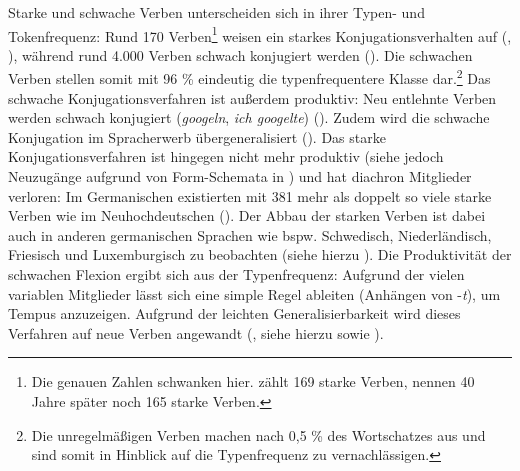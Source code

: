 Starke und schwache Verben unterscheiden sich in ihrer Typen- und Token\-frequenz: Rund 170 Verben\footnote{Die genauen Zahlen schwanken hier. \textcite[258]{Augst.1975} zählt 169 starke Verben, \textcite[310]{Dammel.2014} nennen  40 Jahre später noch 165 starke Verben.} weisen ein starkes Konjugationsverhalten auf (\cite[258]{Augst.1975}, \cite[310]{Dammel.2014}), während rund 4.000 Verben schwach konjugiert werden (\cite[195]{Nubling.1998}). Die schwachen Verben stellen somit mit 96 \% eindeutig die typenfrequentere Klasse dar.\footnote{Die unregelmäßigen Verben machen nach \textcite[258]{Augst.1975} 0,5 \% des Wortschatzes aus und sind somit in Hinblick auf die Typenfrequenz zu vernachlässigen.} Das schwache Konjugationsverfahren ist  außerdem produktiv: Neu entlehnte Verben werden schwach konjugiert (\textit{googeln}, \textit{ich googelte}) (\cite[195]{Nubling.1998}). Zudem wird die schwache Konjugation im Spracherwerb übergeneralisiert (\cite[219--220]{Rumelhart.1986}). Das starke Konjugationsverfahren ist hingegen nicht mehr produktiv (siehe jedoch Neuzugänge aufgrund von Form-Schemata in ) und hat diachron Mitglieder verloren: Im Germanischen existierten mit 381 mehr als doppelt so viele starke Verben wie im Neuhochdeutschen (\cite[310]{Dammel.2014}). Der Abbau der starken Verben ist dabei auch in anderen germanischen Sprachen wie bspw. Schwedisch, Niederländisch, Friesisch und Luxemburgisch zu beobachten (siehe hierzu \cite{Dammel.2010b,Nowak.2010, Schmuck.2010, Dammel.2011b, Dammel.2014, Nowak.2015}). Die Produktivität der schwachen Flexion ergibt sich aus der Typenfrequenz: Aufgrund der vielen variablen Mitglieder lässt sich eine simple Regel ableiten (Anhängen von -\textit{t}), um Tempus anzuzeigen. Aufgrund der leichten Generalisierbarkeit wird dieses Verfahren auf neue Verben angewandt (\cite[67--68]{Goldberg.2019}, siehe hierzu  sowie ). 

